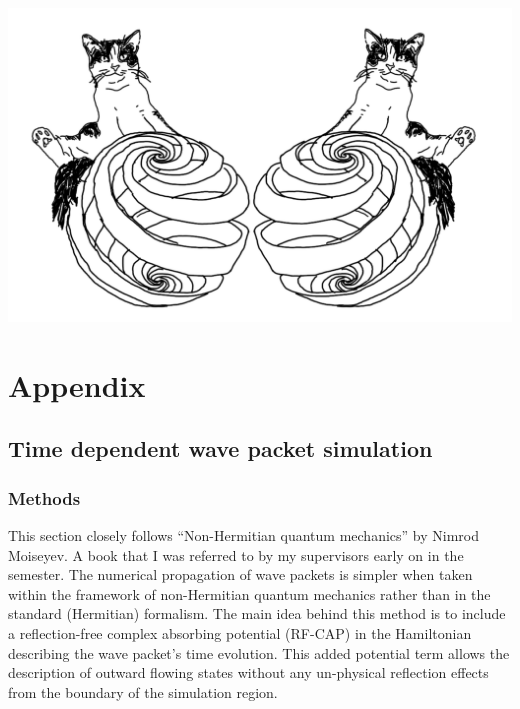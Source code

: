 \documentclass[10pt, a4paper, singlespacing]{report}
\begin{document}
\begin{center}
\vspace{5cm}
\includegraphics[scale=0.2]{bepqed.pdf}
\end{center}

\chapter{Appendix}\label{Appendix}
\section{Time dependent wave packet simulation}\label{Aborted}
\subsection{Methods}
This section closely follows ``Non-Hermitian quantum mechanics'' by Nimrod Moiseyev. A book that I was referred to by my supervisors early on in the semester. The numerical propagation of wave packets is simpler when taken within the framework of non-Hermitian quantum mechanics rather than in the standard (Hermitian) formalism\cite{Moiseyev}. The main idea behind this method is to include a reflection-free complex absorbing potential (RF-CAP) in the Hamiltonian describing the wave packet's time evolution. This added potential term allows the description of outward flowing states without any un-physical reflection effects from the boundary of the simulation region.
\end{document}
